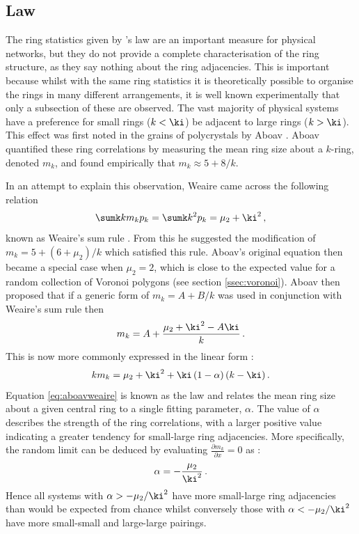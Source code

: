 \subsection{\aw{} Law}
\label{s:awlaw}

The ring statistics given by \lm's law are an important measure for physical networks, but they do not provide a complete characterisation of the ring structure, as they say nothing about the ring adjacencies. 
This is important because whilst with the same ring statistics it is theoretically possible to organise the rings in many different arrangements, it is well known experimentally that only a subsection of these are observed.
The vast majority of physical systems have a preference for small rings ($k<\ki$) be adjacent to large rings ($k>\ki$).
This effect was first noted in the grains of polycrystals by Aboav \cite{Aboav1970}.
Aboav quantified these ring correlations by measuring the mean ring size about a $k$\--ring, denoted $m_k$, and found empirically that $m_k \approx 5 + 8/k$.

In an attempt to explain this observation, Weaire came across the following relation
\begin{equation}
	\label{eq:weairesumrule}
	\sumk km_kp_k = \sumk k^2p_k = \mu_2 + \ki^2 \,,
\end{equation}
known as Weaire's sum rule \cite{Weaire1974}.
From this he suggested the modification of $m_k=5+\left(6+\mu_2\right)/k$ which satisfied this rule.
Aboav's original equation then became a special case when $\mu_2=2$, which is close to the expected value for a random collection of Voronoi polygons (see section \ref{ssec:voronoi}).
Aboav then proposed that if a generic form of $m_k = A + B/k$ was used in conjunction with Weaire's sum rule then
\begin{equation}
	m_k = A+\frac{\mu_2+\ki^2-A\ki}{k}\,.
\end{equation}
This is now more commonly expressed in the linear form \cite{Chiu1995}:
\begin{equation}
	\label{eq:aboavweaire}
	km_k = \mu_2+\ki^2+\ki\left(1-\alpha\right)\left(k-\ki\right).
\end{equation}
Equation \ref{eq:aboavweaire} is known as the \aw{} law and relates the mean ring size about a given central ring to a single fitting parameter, $\alpha$.
The value of $\alpha$ describes the strength of the ring correlations, with a larger positive value indicating a greater tendency for small\--large ring adjacencies.
More specifically, the random limit can be deduced by evaluating $\frac{\partial{m_k}}{\partial{x}}=0$ as \cite{Delannay1994}:
\begin{equation}
	\label{eq:awrandlim}
	\alpha=-\frac{\mu_2}{\ki^2} \,.
\end{equation}
Hence all systems with $\alpha>-\mu_2/\ki^2$ have more small\--large ring  adjacencies than would be expected from chance whilst conversely those with $\alpha<-\mu_2/\ki^2$ have more small\--small and large\--large pairings.

